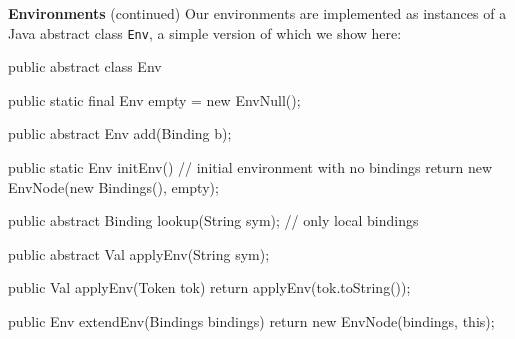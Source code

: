 \begin{minipage}[t]{\sw}
\slidenumber
\LARGE
{\bf Environments} (continued)\exx
Our environments are implemented as instances
of a Java abstract class \verb'Env',
a simple version of which we show here:
{\large
\begin{qv}
public abstract class Env {

    public static final Env empty = new EnvNull();

    public abstract Env add(Binding b);

    public static Env initEnv() {
        // initial environment with no bindings
        return new EnvNode(new Bindings(), empty);
    }

    public abstract Binding lookup(String sym); // only local bindings

    public abstract Val applyEnv(String sym);

    public Val applyEnv(Token tok) {
        return applyEnv(tok.toString());
    }

    public Env extendEnv(Bindings bindings) {
        return new EnvNode(bindings, this);
    }

}
\end{qv}
}
\end{minipage}
\clearpage
